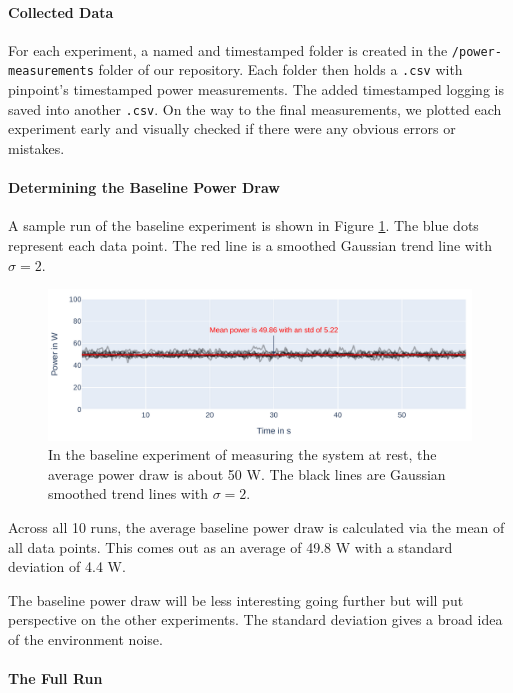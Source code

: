 \paragraph{Collected Data}

For each experiment, a named and timestamped folder is created in the \verb|/power-measurements| folder of our repository. 
Each folder then holds a \verb|.csv| with pinpoint's timestamped power measurements. 
The added timestamped logging is saved into another \verb|.csv|. 
On the way to the final measurements, we plotted each experiment early and visually checked if there were any obvious errors or mistakes.

\paragraph{Determining the Baseline Power Draw}

A sample run of the baseline experiment is shown in Figure \ref{fig:plot_baseline}.
The blue dots represent each data point. The red line is a smoothed Gaussian trend line with $\sigma = 2$. 

\begin{figure}[H]
    \includegraphics[width=\linewidth]{power-measurements/stacked_plots/sleep_0714.pdf}
    \caption{In the baseline experiment of measuring the system at rest, the average power draw is about 50 W. The black lines are Gaussian smoothed trend lines with $\sigma = 2$.}
    \label{fig:plot_baseline}
\end{figure}

Across all 10 runs, the average baseline power draw is calculated via the mean of all data points. This comes out as an average of 49.8 W with a standard deviation of 4.4 W.

The baseline power draw will be less interesting going further but will put perspective on the other experiments. 
The standard deviation gives a broad idea of the environment noise.

\paragraph{The Full Run}

